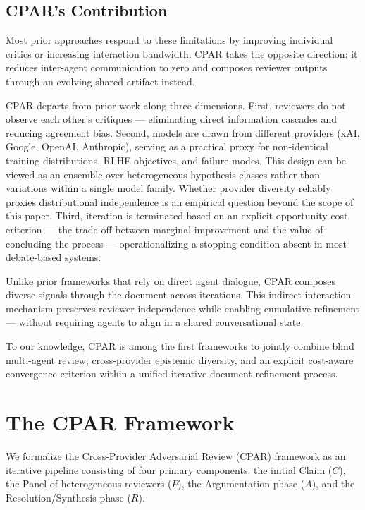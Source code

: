 \documentclass[11pt, a4paper]{article}
\begin{document}
\subsection{CPAR's Contribution}

Most prior approaches respond to these limitations by improving individual critics or increasing interaction bandwidth. CPAR takes the opposite direction: it reduces inter-agent communication to zero and composes reviewer outputs through an evolving shared artifact instead.

CPAR departs from prior work along three dimensions. First, reviewers do not observe each other's critiques --- eliminating direct information cascades and reducing agreement bias. Second, models are drawn from different providers (xAI, Google, OpenAI, Anthropic), serving as a practical proxy for non-identical training distributions, RLHF objectives, and failure modes. This design can be viewed as an ensemble over heterogeneous hypothesis classes rather than variations within a single model family. Whether provider diversity reliably proxies distributional independence is an empirical question beyond the scope of this paper. Third, iteration is terminated based on an explicit opportunity-cost criterion --- the trade-off between marginal improvement and the value of concluding the process --- operationalizing a stopping condition absent in most debate-based systems.

Unlike prior frameworks that rely on direct agent dialogue, CPAR composes diverse signals through the document across iterations. This indirect interaction mechanism preserves reviewer independence while enabling cumulative refinement --- without requiring agents to align in a shared conversational state.

To our knowledge, CPAR is among the first frameworks to jointly combine blind multi-agent review, cross-provider epistemic diversity, and an explicit cost-aware convergence criterion within a unified iterative document refinement process.

\section{The CPAR Framework}
\label{sec:framework}

We formalize the Cross-Provider Adversarial Review (CPAR) framework as an iterative pipeline consisting of four primary components: the initial Claim ($C$), the Panel of heterogeneous reviewers ($P$), the Argumentation phase ($A$), and the Resolution/Synthesis phase ($R$).
\end{document}
